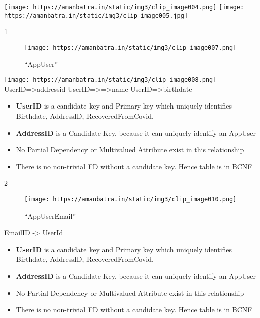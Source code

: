\documentclass[
]{article}
\providecommand{\tightlist}{%
  \setlength{\itemsep}{0pt}\setlength{\parskip}{0pt}}
\begin{document}
\texttt{[image: https://amanbatra.in/static/img3/clip\_image004.png]}
\texttt{[image: https://amanbatra.in/static/img3/clip\_image005.jpg]}

1

\begin{figure}
\centering
\texttt{[image: https://amanbatra.in/static/img3/clip\_image007.png]}
\caption{``AppUser''}
\end{figure}

\texttt{[image: https://amanbatra.in/static/img3/clip\_image008.png]}
UserID=\textgreater addressid UserID=\textgreater=\textgreater name
UserID=\textgreater birthdate

\begin{itemize}
\tightlist
\item
  \textbf{UserID} is a candidate key and Primary key which uniquely
  identifies Birthdate, AddressID, RecoveredFromCovid.
\item
  \textbf{AddressID} is a Candidate Key, because it can uniquely
  identify an AppUser
\item
  No Partial Dependency or Multivalued Attribute exist in this
  relationship
\item
  There is no non-trivial FD without a candidate key. Hence table is in
  BCNF
\end{itemize}

2

\begin{figure}
\centering
\texttt{[image: https://amanbatra.in/static/img3/clip\_image010.png]}
\caption{``AppUserEmail''}
\end{figure}

EmailID -\textgreater{} UserId

\begin{itemize}
\tightlist
\item
  \textbf{UserID} is a candidate key and Primary key which uniquely
  identifies Birthdate, AddressID, RecoveredFromCovid.
\item
  \textbf{AddressID} is a Candidate Key, because it can uniquely
  identify an AppUser
\item
  No Partial Dependency or Multivalued Attribute exist in this
  relationship
\item
  There is no non-trivial FD without a candidate key. Hence table is in
  BCNF
\end{itemize}
\end{document}
